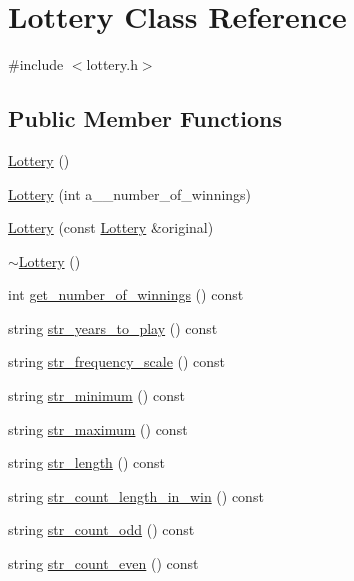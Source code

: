 \hypertarget{classLottery}{\section{Lottery Class Reference}
\label{classLottery}
}


{\ttfamily \#include $<$lottery.\-h$>$}

\subsection*{Public Member Functions}
\begin{DoxyCompactItemize}
\item 
\hyperlink{classLottery_a7a1b304a8eecad27f18358abfd851dd6}{Lottery} ()
\item 
\hyperlink{classLottery_a4bbe3cbf365a3c936c68cab2ffd211ee}{Lottery} (int a\-\_\-\-\_\-number\-\_\-of\-\_\-winnings)
\item 
\hyperlink{classLottery_a409b621f1da31d88876226d9fee1a878}{Lottery} (const \hyperlink{classLottery}{Lottery} \&original)
\item 
\hyperlink{classLottery_a5aebd2c0d75d8ad6bf342cd5a21822b2}{$\sim$\-Lottery} ()
\item 
int \hyperlink{classLottery_a6d8cd54e0482cc5119f03eb361a98336}{get\-\_\-number\-\_\-of\-\_\-winnings} () const 
\item 
string \hyperlink{classLottery_a44f8cd624d10996bb1f60ae3e64ff21f}{str\-\_\-years\-\_\-to\-\_\-play} () const 
\item 
string \hyperlink{classLottery_a0412645bc428380c9c9b84047831832f}{str\-\_\-frequency\-\_\-scale} () const 
\item 
string \hyperlink{classLottery_ad1369e9aafb962a5a9259cb1d19be545}{str\-\_\-minimum} () const 
\item 
string \hyperlink{classLottery_a2363da692f1231f51feef8a6e4fab41a}{str\-\_\-maximum} () const 
\item 
string \hyperlink{classLottery_a192ccaf79c269caa2643732879fef9dc}{str\-\_\-length} () const 
\item 
string \hyperlink{classLottery_ab7e82542619dd409f41ea65b7cbaeaeb}{str\-\_\-count\-\_\-length\-\_\-in\-\_\-win} () const 
\item 
string \hyperlink{classLottery_ad5611e62b126a995bb20143ba813ff95}{str\-\_\-count\-\_\-odd} () const 
\item 
string \hyperlink{classLottery_a31904c6badc3a84993a33f601d150017}{str\-\_\-count\-\_\-even} () const 
\item 

\end{DoxyCompactItemize}
